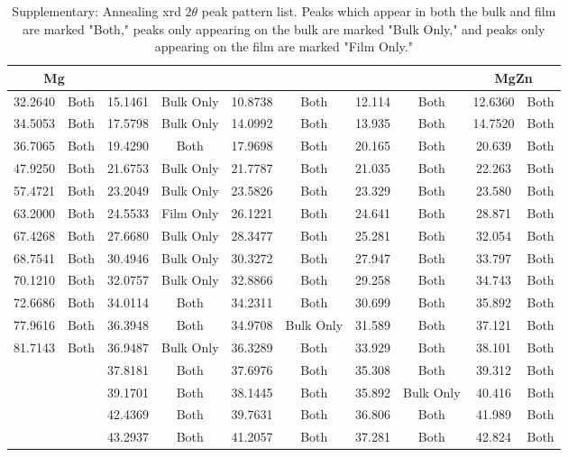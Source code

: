 \documentclass[draft,a4paper,12pt,oneside]{article}%
\begin{document}
\begin{table}[b]
	\centering
	\caption{Supplementary: Annealing \acrshort{xrd} $2 \theta$ peak pattern list. Peaks which appear in both the bulk and film are marked "Both," peaks only appearing on the bulk are marked "Bulk Only," and peaks only appearing on the film are marked "Film Only."}
	\begin{tabular}{cccccccccc}
		\toprule
		\multicolumn{2}{c}{Mg} & \multicolumn{2}{c}{\MgZn} & \multicolumn{2}{c}{\CaMgZnFive} & \multicolumn{2}{c}{\CaMgZnThirteen} & \multicolumn{2}{c}{MgZn} \\
		\midrule
		32.2640 & Both & 15.1461 & Bulk Only & 10.8738 & Both & 12.114 & Both & 12.6360 & Both \\
		34.5053 & Both & 17.5798 & Bulk Only & 14.0992 & Both & 13.935 & Both & 14.7520 & Both \\
		36.7065 & Both & 19.4290 & Both & 17.9698 & Both & 20.165 & Both & 20.639 & Both \\
		47.9250 & Both & 21.6753 & Bulk Only & 21.7787 & Both & 21.035 & Both & 22.263 & Both \\
		57.4721 & Both & 23.2049 & Bulk Only & 23.5826 & Both & 23.329 & Both & 23.580 & Both \\
		63.2000 & Both & 24.5533 & Film Only & 26.1221 & Both & 24.641 & Both & 28.871 & Both \\
		67.4268 & Both & 27.6680 & Bulk Only & 28.3477 & Both & 25.281 & Both & 32.054 & Both \\
		68.7541 & Both & 30.4946 & Bulk Only & 30.3272 & Both & 27.947 & Both & 33.797 & Both \\
		70.1210 & Both & 32.0757 & Bulk Only & 32.8866 & Both & 29.258 & Both & 34.743 & Both \\
		72.6686 & Both & 34.0114 & Both & 34.2311 & Both & 30.699 & Both & 35.892 & Both \\
		77.9616 & Both & 36.3948 & Both & 34.9708 & Bulk Only & 31.589 & Both & 37.121 & Both \\
		81.7143 & Both & 36.9487 & Bulk Only & 36.3289 & Both & 33.929 & Both & 38.101 & Both \\
		&  & 37.8181 & Both & 37.6976 & Both & 35.308 & Both & 39.312 & Both \\
		&  & 39.1701 & Both & 38.1445 & Both & 35.892 & Bulk Only & 40.416 & Both \\
		&  & 42.4369 & Both & 39.7631 & Both & 36.806 & Both & 41.989 & Both \\
		&  & 43.2937 & Both & 41.2057 & Both & 37.281 & Both & 42.824 & Both \\

\end{tabular}
\end{table}
\end{document}
